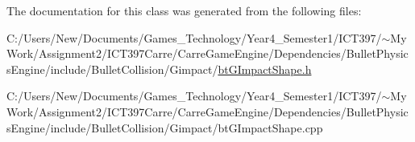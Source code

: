 The documentation for this class was generated from the following files:\begin{CompactItemize}
\item 
C:/Users/New/Documents/Games\_\-Technology/Year4\_\-Semester1/ICT397/$\sim$My Work/Assignment2/ICT397Carre/CarreGameEngine/Dependencies/BulletPhysicsEngine/include/BulletCollision/Gimpact/\hyperlink{bt_g_impact_shape_8h}{btGImpactShape.h}\item 
C:/Users/New/Documents/Games\_\-Technology/Year4\_\-Semester1/ICT397/$\sim$My Work/Assignment2/ICT397Carre/CarreGameEngine/Dependencies/BulletPhysicsEngine/include/BulletCollision/Gimpact/btGImpactShape.cpp\end{CompactItemize}
